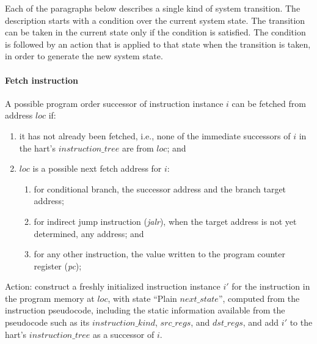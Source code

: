 Each of the paragraphs below describes a single kind of system transition.
The description starts with a condition over the current system state.
The transition can be taken in the current state only if the condition is satisfied.
The condition is followed by an action that is applied to that state when the transition is taken, in order to generate the new system state.

\paragraph{Fetch instruction}\label{omm:fetch}
A possible program order successor of instruction instance $i$ can be fetched from address $loc$ if:
\begin{enumerate}
\item it has not already been fetched, i.e., none of the immediate successors of $i$ in the hart's $instruction\_tree$ are from $loc$; and
\item $loc$ is a possible next fetch address for $i$:
  \begin{enumerate}
  \item for conditional branch, the successor address and the branch target address;
  \item for indirect jump instruction ({\em jalr}), when the target address is not yet determined, any address; and
  \item for any other instruction, the value written to the program counter register ({\em pc});
  \end{enumerate}
\end{enumerate}


Action: construct a freshly initialized instruction instance $i'$ for the instruction in the program memory at $loc$, with state ``{\sc Plain} $next\_state$'', computed from the instruction pseudocode, including the static information available from the pseudocode such as its $instruction\_kind$, $src\_regs$, and $dst\_regs$, and add $i'$ to the hart's $instruction\_tree$ as a successor of $i$.

